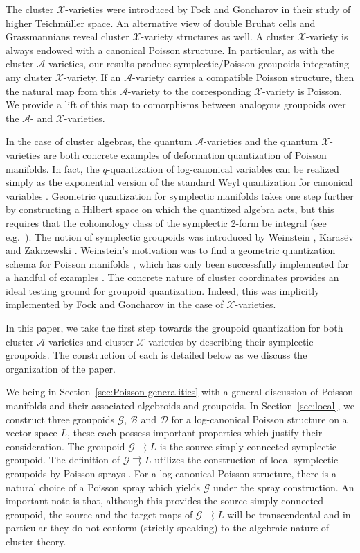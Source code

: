 \documentclass{amsart}
\numberwithin{equation}{section}
\newcommand{\cA}{\mathcal{A}}
\newcommand{\cB}{\mathcal{B}}
\newcommand{\cD}{\mathcal{D}}
\newcommand{\cG}{\mathcal{G}}
\newcommand{\cX}{\mathcal{X}}
\newcommand{\rra}{\rightrightarrows}
\begin{document}
The cluster $\cX$-varieties were introduced by Fock and Goncharov \cite{FG09a} in their study of higher Teichm\"uller space.
An alternative view of double Bruhat cells and Grassmannians reveal cluster $\cX$-variety structures as well.
A cluster $\cX$-variety is always endowed with a canonical Poisson structure.
In particular, as with the cluster $\cA$-varieties, our results produce symplectic/Poisson groupoids integrating any cluster $\cX$-variety.
If an $\cA$-variety carries a compatible Poisson structure, then the natural map from this $\cA$-variety to the corresponding $\cX$-variety is Poisson.
We provide a lift of this map to comorphisms between analogous groupoids over the $\cA$- and $\cX$-varieties.

In the case of cluster algebras, the quantum $\cA$-varieties \cite{BZ05} and the quantum $\cX$-varieties \cite{FG09a} are both concrete examples of deformation quantization of Poisson manifolds.
In fact, the $q$-quantization of log-canonical variables can be realized simply as the exponential version of the standard Weyl quantization for canonical variables \cite{FG09c}.
Geometric quantization for symplectic manifolds takes one step further by constructing a Hilbert space on which the quantized algebra acts, but this requires that the cohomology class of the symplectic 2-form be integral (see e.g.\ \cite{BW97}).
The notion of symplectic groupoids was introduced by Weinstein \cite{Wei87}, Karas\"{e}v \cite{Kar89} and Zakrzewski \cite{Zak90a, Zak90b}.
Weinstein's motivation was to find a geometric quantization schema for Poisson manifolds \cite{Wei91}, which has only been successfully implemented for a handful of examples \cite{Tan06, Haw08, BCST12}.
The concrete nature of cluster coordinates provides an ideal testing ground for groupoid quantization.
Indeed, this was implicitly implemented by Fock and Goncharov \cite{FG09c} in the case of $\cX$-varieties.

In this paper, we take the first step towards the groupoid quantization for both cluster $\cA$-varieties and cluster $\cX$-varieties by describing their symplectic groupoids.
The construction of each is detailed below as we discuss the organization of the paper.

We being in Section~\ref{sec:Poisson generalities} with a general discussion of Poisson manifolds and their associated algebroids and groupoids.
In Section~\ref{sec:local}, we construct three groupoids $\cG$, $\cB$ and $\cD$ for a log-canonical Poisson structure on a vector space $L$, these each possess important properties which justify their consideration.
The groupoid $\cG \rra L$ is the source-simply-connected symplectic groupoid.
The definition of $\cG \rra L$ utilizes the construction of local symplectic groupoids by Poisson sprays \cite{CM11, CMS17}.
For a log-canonical Poisson structure, there is a natural choice of a Poisson spray which yields $\cG$ under the spray construction.
An important note is that, although this provides the source-simply-connected groupoid, the source and the target maps of $\cG \rra L$ will be transcendental and in particular they do not conform (strictly speaking) to the algebraic nature of cluster theory.
\end{document}
